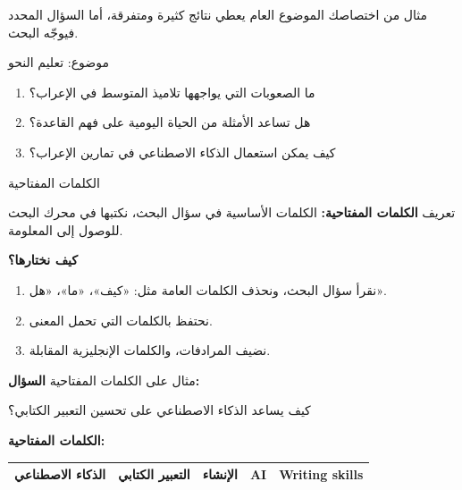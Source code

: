 \documentclass[aspectratio=169, 11pt, xcolor={table}]{beamer}
\begin{document}
\begin{frame}{مثال من اختصاصك}
    الموضوع العام يعطي نتائج كثيرة ومتفرقة، أما السؤال المحدد فيوجّه البحث.
    \begin{tbox}{\faChalkboardTeacher\quad موضوع: تعليم النحو}
        \begin{enumerate}
            \item ما الصعوبات التي يواجهها تلاميذ المتوسط في الإعراب؟
            \item هل تساعد الأمثلة من الحياة اليومية على فهم القاعدة؟
            \item كيف يمكن استعمال الذكاء الاصطناعي في تمارين الإعراب؟
        \end{enumerate}
    \end{tbox}
\end{frame}

\begin{frame}{الكلمات المفتاحية}
    \begin{tbox}{\faLightbulb\quad تعريف}
        \textbf{الكلمات المفتاحية:} الكلمات الأساسية في سؤال البحث،
        نكتبها في محرك البحث للوصول إلى المعلومة.
    \end{tbox}
    \textbf{\color{tealDeep}كيف نختارها؟}
    \begin{enumerate}
        \item نقرأ سؤال البحث، ونحذف الكلمات العامة مثل: «كيف»، «ما»، «هل».
        \item نحتفظ بالكلمات التي تحمل المعنى.
        \item نضيف المرادفات، والكلمات الإنجليزية المقابلة.
    \end{enumerate}
\end{frame}

\begin{frame}{مثال على الكلمات المفتاحية}
    \textbf{\color{tealDeep}السؤال:}
    \begin{amr}[brandTeal]
        كيف يساعد الذكاء الاصطناعي على تحسين التعبير الكتابي؟
    \end{amr}
    \textbf{\color{tealDeep}الكلمات المفتاحية:}
    \begin{center}
        \begin{tabular}{|c|c|c|c|c|}
            \hline
            الذكاء الاصطناعي & التعبير الكتابي & الإنشاء &
            \textenglish{AI} & \textenglish{Writing skills} \\ \hline
        \end{tabular}
    \end{center}
\end{frame}
\end{document}
